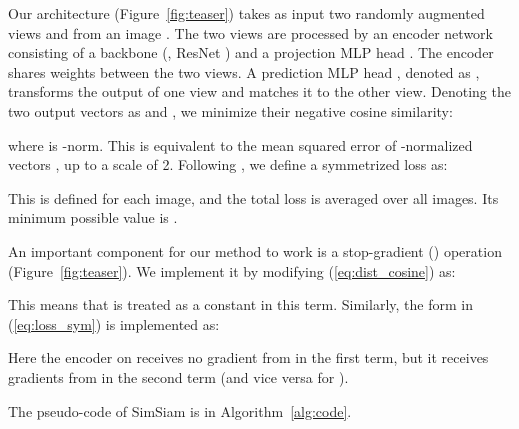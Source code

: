 \documentclass[final]{cvpr}
\begin{document}
Our architecture (Figure~\ref{fig:teaser}) takes as input two randomly augmented views  and  from an image .
The two views are processed by an encoder network  consisting of a backbone (\eg, ResNet \cite{He2016}) and a projection MLP head \cite{Chen2020}. The encoder  shares weights between the two views. A prediction MLP head \cite{Grill2020}, denoted as , transforms the output of one view and matches it to the other view.
Denoting the two output vectors as  and ,
we minimize their negative cosine similarity:
\newcommand{\lnorm}[1]{\frac{#1}{\left\lVert{#1}\right\rVert _2}}
\newcommand{\lnormv}[1]{{#1}/{\left\lVert{#1}\right\rVert _2}}

where  is -norm. This is equivalent to the mean squared error of -normalized vectors \cite{Grill2020}, up to a scale of 2.
Following \cite{Grill2020}, we define a symmetrized loss as:
 
This is defined for each image, and the total loss is averaged over all images. Its minimum possible value is .

An important component for our method to work is a \mbox{stop-gradient} () operation (Figure~\ref{fig:teaser}). We implement it by modifying (\ref{eq:dist_cosine}) as:

This means that  is treated as a constant in this term.
Similarly, the form in (\ref{eq:loss_sym}) is implemented as:

Here the encoder on  receives no gradient from  in the first term, but it receives gradients from  in the second term (and vice versa for ).

The pseudo-code of SimSiam is in Algorithm~\ref{alg:code}.
\end{document}
